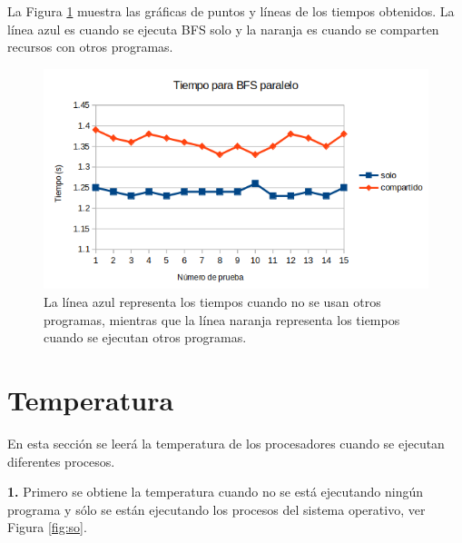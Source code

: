 \documentclass{article}
\begin{document}
La Figura \ref{fig:grafico3} muestra las gráficas de puntos y líneas de los tiempos obtenidos. La línea azul es cuando se ejecuta BFS solo y la naranja es cuando se comparten recursos con otros programas.

\begin{figure}[htbp]

\center

\includegraphics[scale=0.5]{imagenes/grafico3}

\caption{La línea azul representa los tiempos cuando no se usan otros programas, mientras que la línea naranja representa los tiempos cuando se ejecutan otros programas.} \label{fig:grafico3}

\end{figure}

\section{Temperatura}

En esta sección se leerá la temperatura de los procesadores cuando se ejecutan diferentes procesos.

\textbf{1.} Primero se obtiene la temperatura cuando no se está ejecutando ningún programa y sólo se están ejecutando los procesos del sistema operativo, ver Figura \ref{fig:so}.
\end{document}
